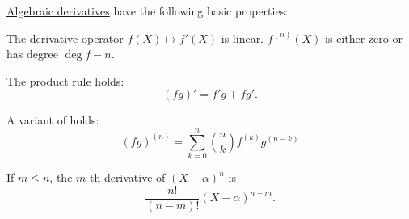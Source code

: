 \begin{proposition}\label{thm:def:algebraic_derivative}
  \hyperref[def:algebraic_derivative]{Algebraic derivatives} have the following basic properties:
  \begin{thmenum}
     The derivative operator \( f(X) \mapsto f'(X) \) is linear.
     \( f^{(n)}(X) \) is either zero or has degree \( \deg f - n \).

     The product rule holds:
    \begin{equation}\label{eq:thm:def:algebraic_derivative/product}
      (fg)' = f'g + fg'.
    \end{equation}

     A variant of  holds:
    \begin{equation}\label{eq:thm:def:algebraic_derivative/leibniz}
      (fg)^{(n)} = \sum_{k=0}^n \binom n k f^{(k)} g^{(n-k)}
    \end{equation}

     If \( m \leq n \), the \( m \)-th derivative of \( (X - \alpha)^n \) is
    \begin{equation*}
      \frac {n!} {(n-m)!} (X - \alpha)^{n-m}.
    \end{equation*}
  \end{thmenum}
\end{proposition}
